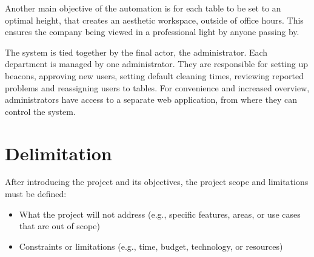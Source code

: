 Another main objective of the automation is for each table to be set to an optimal height, that creates an aesthetic workspace, outside of office hours. This ensures the company being viewed in a professional light by anyone passing by.\par
The system is tied together by the final actor, the administrator. Each department is managed by one administrator. They are responsible for setting up beacons, approving new users, setting default cleaning times, reviewing reported problems and reassigning users to tables. For convenience and increased overview, administrators have access to a separate web application, from where they can control the system.\par

\section{Delimitation} After introducing the project and its objectives, the project scope and limitations must be defined: 

\begin{itemize} 
    \item What the project will not address (e.g., specific features, areas, or use cases that are out of scope) 
    \item Constraints or limitations (e.g., time, budget, technology, or resources)
\end{itemize}